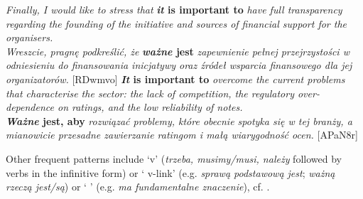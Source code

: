 \documentclass[output=paper]{langscibook}
\begin{document}
\ea
\ea \textit{Finally, I would like to stress that} \textbf{\textit{it} \textbf{is} \textbf{important} \textbf{to}} \textit{have full transparency regarding the founding of the initiative and sources of financial support for the organisers.}\\
\textit{Wreszcie, pragnę podkreślić, że} \textbf{\textit{ważne} \textbf{jest}} \textit{zapewnienie pełnej przejrzystości w odniesieniu do finansowania inicjatywy oraz źródeł wsparcia finansowego dla jej organizatorów.} [RDwmvo]
\ex \textbf{\textit{It} \textbf{is} \textbf{important} \textbf{to}} \textit{overcome the current problems that characterise the sector: the lack of competition, the regulatory over-dependence on ratings, and the low reliability of notes.} \\
\textbf{\textit{Ważne} \textbf{jest,} \textbf{aby}} \textit{rozwiązać problemy, które obecnie spotyka się w tej branży, a mianowicie przesadne zawierzanie ratingom i małą wiarygodność ocen.} [APaN8r]
\z
\z

Other frequent patterns include ‘{\MOD}v’ (\textit{trzeba, musimy/musi, należy} followed by verbs in the infinitive form) or ‘{\NN} {\ADJ} v-link’ (e.g. \textit{sprawą podstawową jest}; \textit{ważną rzeczą jest/są}) or ‘{\glossV} {\ADJ} {\NN}’ (e.g. \textit{ma fundamentalne znaczenie}), cf. .
\end{document}
